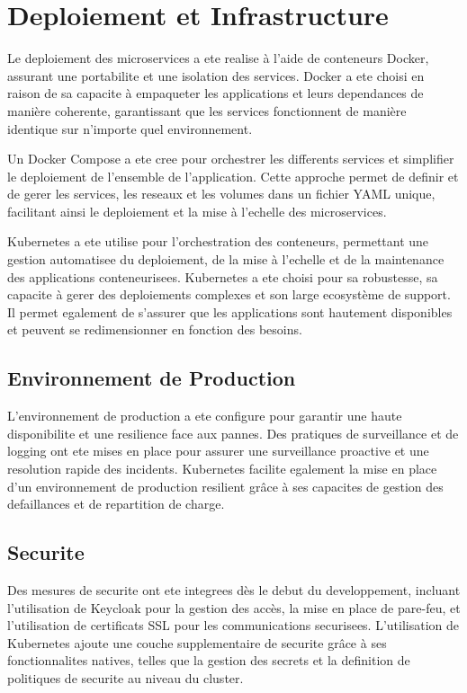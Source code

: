 \documentclass[a4paper, 11pt, openany]{report}
\begin{document}
\clearpage


\section{Deploiement et Infrastructure}
Le deploiement des microservices a ete realise à l'aide de conteneurs Docker, assurant une portabilite et une isolation des services. Docker a ete choisi en raison de sa capacite à empaqueter les applications et leurs dependances de manière coherente, garantissant que les services fonctionnent de manière identique sur n'importe quel environnement. 

Un Docker Compose a ete cree pour orchestrer les differents services et simplifier le deploiement de l'ensemble de l'application. Cette approche permet de definir et de gerer les services, les reseaux et les volumes dans un fichier YAML unique, facilitant ainsi le deploiement et la mise à l'echelle des microservices.

Kubernetes a ete utilise pour l'orchestration des conteneurs, permettant une gestion automatisee du deploiement, de la mise à l'echelle et de la maintenance des applications conteneurisees. Kubernetes a ete choisi pour sa robustesse, sa capacite à gerer des deploiements complexes et son large ecosystème de support. Il permet egalement de s'assurer que les applications sont hautement disponibles et peuvent se redimensionner en fonction des besoins.

\subsection{Environnement de Production}
L'environnement de production a ete configure pour garantir une haute disponibilite et une resilience face aux pannes. Des pratiques de surveillance et de logging ont ete mises en place pour assurer une surveillance proactive et une resolution rapide des incidents. Kubernetes facilite egalement la mise en place d'un environnement de production resilient grâce à ses capacites de gestion des defaillances et de repartition de charge.

\subsection{Securite}
Des mesures de securite ont ete integrees dès le debut du developpement, incluant l'utilisation de Keycloak pour la gestion des accès, la mise en place de pare-feu, et l'utilisation de certificats SSL pour les communications securisees. L'utilisation de Kubernetes ajoute une couche supplementaire de securite grâce à ses fonctionnalites natives, telles que la gestion des secrets et la definition de politiques de securite au niveau du cluster.
\end{document}
